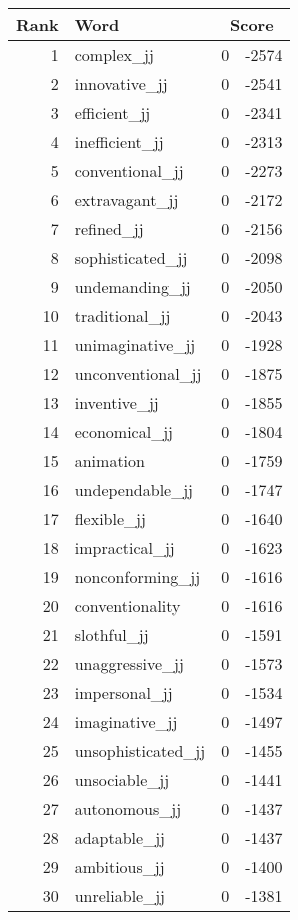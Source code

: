 \begin{longtable}[!htbp]{| rlr@{.}l |}
    \hline
    \textbf{Rank} & \textbf{Word} & \multicolumn{2}{c|}{\textbf{Score}} \\
    \hline
    \endhead
    1 & complex\_jj & 0 & -2574 \\
    2 & innovative\_jj & 0 & -2541 \\
    3 & efficient\_jj & 0 & -2341 \\
    4 & inefficient\_jj & 0 & -2313 \\
    5 & conventional\_jj & 0 & -2273 \\
    6 & extravagant\_jj & 0 & -2172 \\
    7 & refined\_jj & 0 & -2156 \\
    8 & sophisticated\_jj & 0 & -2098 \\
    9 & undemanding\_jj & 0 & -2050 \\
    10 & traditional\_jj & 0 & -2043 \\
    11 & unimaginative\_jj & 0 & -1928 \\
    12 & unconventional\_jj & 0 & -1875 \\
    13 & inventive\_jj & 0 & -1855 \\
    14 & economical\_jj & 0 & -1804 \\
    15 & animation & 0 & -1759 \\
    16 & undependable\_jj & 0 & -1747 \\
    17 & flexible\_jj & 0 & -1640 \\
    18 & impractical\_jj & 0 & -1623 \\
    19 & nonconforming\_jj & 0 & -1616 \\
    20 & conventionality & 0 & -1616 \\
    21 & slothful\_jj & 0 & -1591 \\
    22 & unaggressive\_jj & 0 & -1573 \\
    23 & impersonal\_jj & 0 & -1534 \\
    24 & imaginative\_jj & 0 & -1497 \\
    25 & unsophisticated\_jj & 0 & -1455 \\
    26 & unsociable\_jj & 0 & -1441 \\
    27 & autonomous\_jj & 0 & -1437 \\
    28 & adaptable\_jj & 0 & -1437 \\
    29 & ambitious\_jj & 0 & -1400 \\
    30 & unreliable\_jj & 0 & -1381 \\

\end{longtable}
